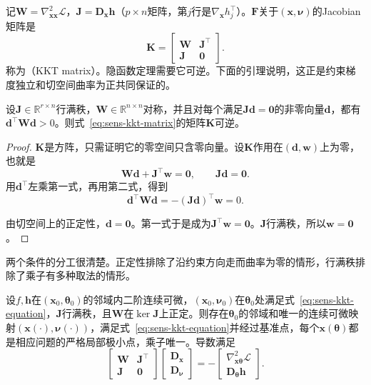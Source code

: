 记$\bm{W}=\nabla^2_{\bm{x}\bm{x}}\mathcal{L}$，$\bm{J}=\bm{D}_{\bm{x}}\bm{h}$（$p\times n$矩阵，第$j$行是$\nabla_{\bm{x}}h_j^{\top}$）。$\bm{F}$关于$(\bm{x},\bm{\nu})$的Jacobian矩阵是
\begin{equation}
 \bm{K}=\begin{bmatrix}\bm{W}&\bm{J}^{\top}\\\bm{J}&\bm{0}\end{bmatrix}.
 \label{eq:sens-kkt-matrix}
\end{equation}
称为（KKT matrix）。隐函数定理需要它可逆。下面的引理说明，这正是约束梯度独立和切空间曲率为正共同保证的。

\begin{lemma}[KKT矩阵可逆]
\label{lem:sens-kkt-invertible}
设$\bm{J}\in\mathbb{R}^{r\times n}$行满秩，$\bm{W}\in\mathbb{R}^{n\times n}$对称，并且对每个满足$\bm{J}\bm{d}=\bm{0}$的非零向量$\bm{d}$，都有$\bm{d}^{\top}\bm{W}\bm{d}>0$。则式~\eqref{eq:sens-kkt-matrix}的矩阵$\bm{K}$可逆。
\end{lemma}

\begin{proof}
$\bm{K}$是方阵，只需证明它的零空间只含零向量。设$\bm{K}$作用在$(\bm{d},\bm{w})$上为零，也就是
\[
 \bm{W}\bm{d}+\bm{J}^{\top}\bm{w}=\bm{0},\qquad\bm{J}\bm{d}=\bm{0}.
\]
用$\bm{d}^{\top}$左乘第一式，再用第二式，得到
\[
 \bm{d}^{\top}\bm{W}\bm{d}=-(\bm{J}\bm{d})^{\top}\bm{w}=0.
\]

由切空间上的正定性，$\bm{d}=\bm{0}$。第一式于是成为$\bm{J}^{\top}\bm{w}=\bm{0}$。$\bm{J}$行满秩，所以$\bm{w}=\bm{0}$。
\end{proof}

两个条件的分工很清楚。正定性排除了沿约束方向走而曲率为零的情形，行满秩排除了乘子有多种取法的情形。

\begin{theorem}[等式约束极小解的导数]
\label{thm:sens-equality}
设$f,\bm{h}$在$(\bm{x}_0,\bm{\theta}_0)$的邻域内二阶连续可微，$(\bm{x}_0,\bm{\nu}_0)$在$\bm{\theta}_0$处满足式~\eqref{eq:sens-kkt-equation}，$\bm{J}$行满秩，且$\bm{W}$在$\ker\bm{J}$上正定。则存在$\bm{\theta}_0$的邻域和唯一的连续可微映射$(\bm{x}(\cdot),\bm{\nu}(\cdot))$，满足式~\eqref{eq:sens-kkt-equation}并经过基准点，每个$\bm{x}(\bm{\theta})$都是相应问题的严格局部极小点，乘子唯一。导数满足
\begin{equation}
 \begin{bmatrix}\bm{W}&\bm{J}^{\top}\\\bm{J}&\bm{0}\end{bmatrix}
 \begin{bmatrix}\bm{D}_{\bm{x}}\\\bm{D}_{\bm{\nu}}\end{bmatrix}
 =-\begin{bmatrix}\nabla^2_{\bm{x}\bm{\theta}}\mathcal{L}\\\bm{D}_{\bm{\theta}}\bm{h}\end{bmatrix}.
 \label{eq:sens-equality-derivative}
\end{equation}
\end{theorem}

